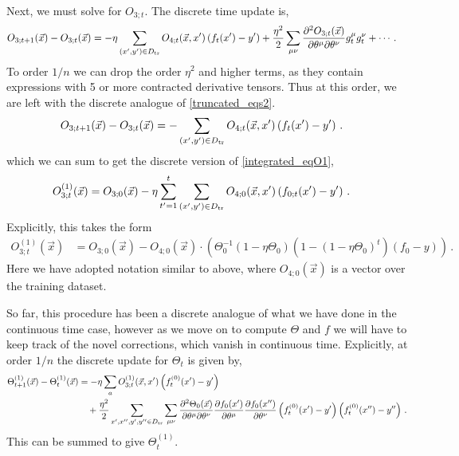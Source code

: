 \documentclass[english]{article}
\newcommand{\es}[2] {\begin{align} \label{#1} #2 \end{align}}
\begin{document}
Next, we must solve for $O_{3;t}$. The discrete time update is,
\es{O1_update_disc}{
O_{3;t+1}(\vec{x})-O_{3;t}(\vec{x})&=
-\eta \sum_{(x',y')\in D_{\rm tr}}O_{4;t}(\vec{x},x')\left(f_{t}(x')-y'\right)
+\frac{\eta^{2}}{2}\sum_{\mu\nu}\frac{\partial^{2}O_{3;t}(\vec{x})}{\partial\theta^{\mu}\partial\theta^{\nu}}g^{\mu}_{t}g^{\nu}_{t}+\cdots\,.
}
To order $1/n$ we can drop the order $\eta^{2}$ and higher terms, as they contain expressions with 5 or more contracted derivative tensors.
Thus at this order, we are left with the discrete analogue of \eqref{truncated_eqs2}.
\es{O1_update_disc_leading}{
O_{3;t+1}(\vec{x})-O_{3;t}(\vec{x})&=-\sum_{(x',y')\in D_{\rm tr}}O_{4;t}(\vec{x},x')\left(f_t(x')-y'\right)\,.
}
which we can sum to get the discrete version of \eqref{integrated_eqO1},
\es{O1_disc_leading}{
O^{(1)}_{3;t}(\vec{x})&=O_{3;0}(\vec{x})-\eta\sum_{t^{\prime}=1}^{t}\sum_{(x',y')\in D_{\rm tr}}O_{4;0}(\vec{x},x')\left( f_{0;t}(x')-y'\right)\,.
}
Explicitly, this takes the form
\es{O1_disc_leading_exp}{
O^{(1)}_{3;t}(\vec{x})&=O_{3;0}(\vec{x})-O_{4;0}(\vec{x})\cdot\left(\Theta_{0}^{-1}(1-\eta\Theta_{0})(1-(1-\eta\Theta_{0})^{t})\left(f_{0}-y\right)\right)\,.
}
Here we have adopted notation similar to above, where $O_{4;0}(\vec{x})$ is a vector over the training dataset.

So far, this procedure has been a discrete analogue of what we have done in the continuous time case, however as we move on to compute $\Theta$ and $f$ we will have to keep track of the novel corrections, which vanish in continuous time. Explicitly, at order $1/n$ the discrete update for $\Theta_{t}$ is given by,
\begin{align}
\Theta_{t+1}^{(1)}(\vec{x}) - \Theta_{t}^{(1)}(\vec{x})&=-\eta \sum_{a}O_{3;t}^{(1)}(\vec{x},x')\left(f_{t}^{(0)}(x')-y'\right)\nonumber\\
&\quad +\frac{\eta^{2}}{2}\sum_{x',x'',y',y''\in D_{\rm tr}}\sum_{\mu\nu}\frac{\partial^{2}\Theta_{0}(\vec{x})}{\partial\theta^{\mu}\partial\theta^{\nu}}\frac{\partial f_{0}(x')}{\partial\theta^{\mu}}\frac{\partial f_{0}(x'')}{\partial\theta^{\nu}}\left(f_{t}^{(0)}(x')-y'\right)\left(f_{t}^{(0)}(x'')-y''\right)\,.\label{disc_theta_update_nlo}
\end{align}
This can be summed to give $\Theta_{t}^{(1)}$.
\end{document}
